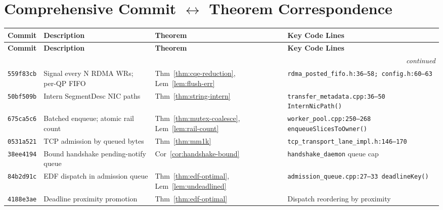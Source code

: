 \documentclass[11pt,a4paper,twoside]{article}
\theoremstyle{plain}
\theoremstyle{definition}
\theoremstyle{remark}
\begin{document}
\section{Comprehensive Commit $\longleftrightarrow$ Theorem Correspondence}
\label{sec:map}

\begin{small}
\begin{longtable}{p{1.6cm}p{4.5cm}p{2.5cm}p{4.5cm}}
\toprule
\textbf{Commit} & \textbf{Description} & \textbf{Theorem} & \textbf{Key Code Lines} \\
\midrule
\endfirsthead
\toprule
\textbf{Commit} & \textbf{Description} & \textbf{Theorem} & \textbf{Key Code Lines} \\
\midrule
\endhead
\midrule
\multicolumn{4}{r}{\textit{continued}} \\
\bottomrule
\endfoot
\bottomrule
\endlastfoot

\texttt{559f83cb} & Signal every N RDMA WRs; per-QP FIFO &
  Thm~\ref{thm:cqe-reduction}, Lem~\ref{lem:flush-err} &
  \texttt{rdma\_posted\_fifo.h:36--58; config.h:60--63} \\

\texttt{50bf509b} & Intern SegmentDesc NIC paths &
  Thm~\ref{thm:string-intern} &
  \texttt{transfer\_metadata.cpp:36--50 InternNicPath()} \\

\texttt{675ca5c6} & Batched enqueue; atomic rail count &
  Thm~\ref{thm:mutex-coalesce}, Lem~\ref{lem:rail-count} &
  \texttt{worker\_pool.cpp:250--268 enqueueSlicesToOwner()} \\

\texttt{0531a521} & TCP admission by queued bytes &
  Thm~\ref{thm:mm1k} &
  \texttt{tcp\_transport\_lane\_impl.h:146--170} \\

\texttt{38ee4194} & Bound handshake pending-notify queue &
  Cor~\ref{cor:handshake-bound} &
  \texttt{handshake\_daemon} queue cap \\

\texttt{84b2d91c} & EDF dispatch in admission queue &
  Thm~\ref{thm:edf-optimal}, Lem~\ref{lem:undeadlined} &
  \texttt{admission\_queue.cpp:27--33 deadlineKey()} \\

\texttt{4188e3ae} & Deadline proximity promotion &
  Thm~\ref{thm:edf-optimal} &
  Dispatch reordering by proximity \\


\end{longtable}
\end{small}
\end{document}
